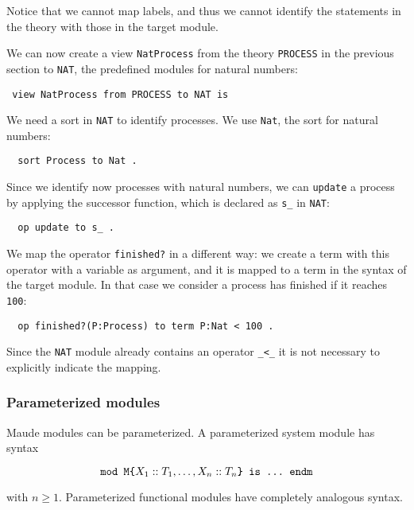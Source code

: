 Notice that we cannot map labels, and thus we cannot identify the statements in
the theory with those in the target module.

We can now create a view \verb"NatProcess" from the theory \verb"PROCESS" in the
previous section to \verb"NAT", the predefined modules for natural numbers:

{\codesize
\begin{verbatim}
 view NatProcess from PROCESS to NAT is
\end{verbatim}
}

We need a sort in \verb"NAT" to identify processes. We use \verb"Nat", the sort
for natural numbers:

{\codesize
\begin{verbatim}
  sort Process to Nat .
\end{verbatim}
}

Since we identify now processes with natural numbers, we can \verb"update" a process
by applying the successor function, which is declared as \verb"s_" in \verb"NAT":

{\codesize
\begin{verbatim}
  op update to s_ .
\end{verbatim}
}

We map the operator \verb"finished?" in a different way: we create a term
with this operator with a variable as argument, and it is mapped to a term
in the syntax of the target module. In that case we consider a process has
finished if it reaches \verb"100":

{\codesize
\begin{verbatim}
  op finished?(P:Process) to term P:Nat < 100 .
\end{verbatim}
}

Since the \verb"NAT" module already contains an operator \verb"_<_" it is not
necessary to explicitly indicate the mapping.

\subsubsection{Parameterized modules}\label{subsec:pmod}

Maude modules can be parameterized. A parameterized
system module has syntax

$$
\verb"mod M{" X_1 :: T_1 , \ldots , X_n :: T_n \verb"} is ... endm"
$$

\noindent with $n \geq 1$. Parameterized functional modules have completely
analogous syntax.

